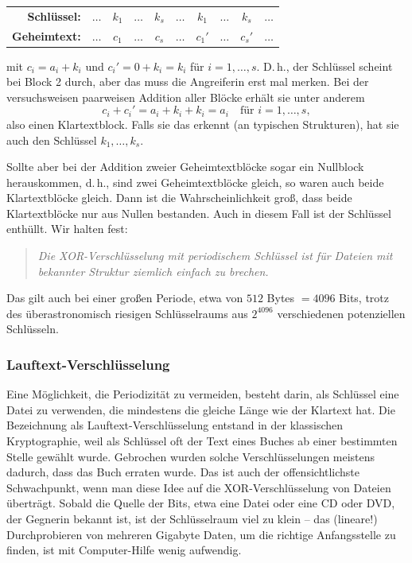 \begin{refsegment}
\begin{center}
\begin{tabular}{rc|ccc|c|ccc|c}
   \textbf{Schlüssel:}  & $\ldots$ & $k_1$ & $\ldots$ & $k_s$     & $\ldots$ & $k_1$  & $\ldots$ & $k_s$    & $\ldots$ \\
   \textbf{Geheimtext:} & $\ldots$ & $c_1$ & $\ldots$ & $c_s$     & $\ldots$ & $c_1'$ & $\ldots$ & $c_s'$   & $\ldots$
\end{tabular}
\end{center}
mit $c_i = a_i + k_i$ und $c_i' = 0 + k_i = k_i$ für $i = 1, \ldots, s$.
D.\,h., der Schlüssel scheint bei Block 2 durch, aber das muss die Angreiferin
erst mal merken. Bei der versuchsweisen paarweisen Addition aller Blöcke
erhält sie unter anderem
\[
     c_i + c_i' = a_i + k_i + k_i = a_i \quad\text{für } i = 1, \ldots, s,
\]
also einen Klartextblock. Falls sie das erkennt (an typischen Strukturen),
hat sie auch den Schlüssel $k_1, \ldots, k_s$.

Sollte aber bei der Addition zweier Geheimtextblöcke sogar ein Nullblock herauskommen,
d.\,h., sind zwei Geheimtextblöcke gleich, so waren auch beide Klartextblöcke
gleich. Dann ist die Wahrscheinlichkeit groß, dass beide Klartextblöcke
nur aus Nullen bestanden. Auch in diesem Fall ist der Schlüssel enthüllt.
Wir halten fest:
\begin{quote}
   {\em Die XOR-Verschlüsselung mit periodischem Schlüssel ist für
   Dateien mit bekannter Struktur ziemlich einfach zu brechen.}
\end{quote}
Das gilt auch bei einer großen Periode, etwa von $512$ Bytes $= 4096$ Bits,
trotz des überastronomisch riesigen Schlüsselraums aus $2^{4096}$ verschiedenen
potenziellen Schlüsseln.


\subsubsection*{Lauftext-Verschlüsselung}

Eine Möglichkeit, die Periodizität zu vermeiden, besteht darin, als Schlüssel
eine Datei zu verwenden, die mindestens die gleiche Länge wie der Klartext hat.
Die Bezeichnung als Lauftext-Verschlüsselung
entstand in der klassischen Kryptographie, weil als Schlüssel oft der Text eines Buches ab
einer bestimmten Stelle gewählt wurde. Gebrochen wurden solche Verschlüsselungen
meistens dadurch, dass das Buch erraten wurde. Das ist auch der
offensichtlichste Schwachpunkt, wenn man diese Idee auf die XOR-Verschlüsselung
von Dateien überträgt. Sobald die Quelle der Bits, etwa eine Datei oder eine
CD oder DVD, der Gegnerin bekannt ist, ist der Schlüsselraum viel zu klein --
das (lineare!) Durchprobieren von mehreren Gigabyte Daten, um die richtige
Anfangsstelle zu finden, ist mit Computer-Hilfe wenig aufwendig.


\end{refsegment}
